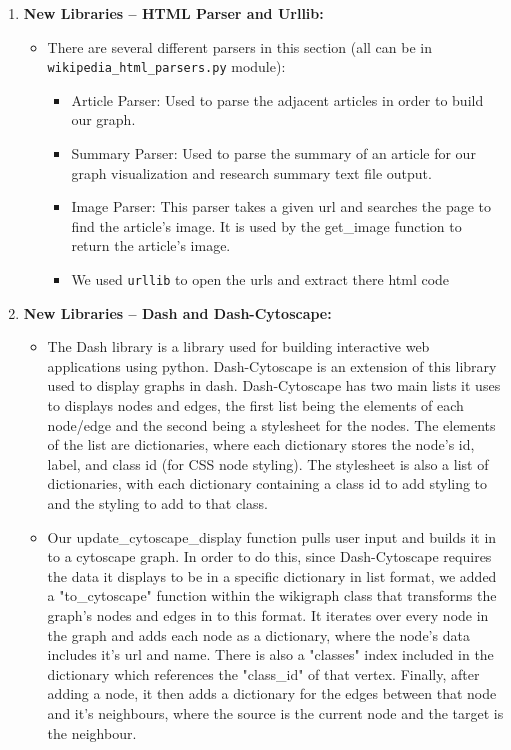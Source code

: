 \documentclass[fontsize=11pt]{article}
\begin{document}
\begin{enumerate}
\begin{itemize}
    \end{itemize}
    \item \textbf{New Libraries – HTML Parser and Urllib:}
    \begin{itemize}
        \item There are several different parsers in this section (all can be in \texttt{wikipedia\_html\_parsers.py} module):
        \begin{itemize}
        \item Article Parser: Used to parse the adjacent articles in order to build our graph.
        \item Summary Parser: Used to parse the summary of an article for our graph visualization and research summary text file output.
        \item Image Parser: This parser takes a given url and searches the page to find the article's image.  It is used by the get\_image function to return the article's image.
        \item We used \texttt{urllib} to open the urls and extract there html code
        \end{itemize}
    \end{itemize}
    \item \textbf{New Libraries – Dash and Dash-Cytoscape:}
    \begin{itemize}
        \item The Dash library is a library used for building interactive web applications using python. Dash-Cytoscape is an extension of this library used to display graphs in dash. Dash-Cytoscape has two main lists it uses to displays nodes and edges, the first list being the elements of each node/edge and the second being a stylesheet for the nodes. The elements of the list are dictionaries, where each dictionary stores the node's id, label, and class id (for CSS node styling). The stylesheet is also a list of dictionaries, with each dictionary containing a class id to add styling to and the styling to add to that class.
        \item Our update\_cytoscape\_display function pulls user input and builds it in to a cytoscape graph. In order to do this, since Dash-Cytoscape requires the data it displays to be in a specific dictionary in list format, we added a "to\_cytoscape" function within the wikigraph class that transforms the graph's nodes and edges in to this format. It iterates over every node in the graph and adds each node as a dictionary, where the node's data includes it's url and name. There is also a "classes" index included in the dictionary which references the "class\_id" of that vertex. Finally, after adding a node, it then adds a dictionary for the edges between that node and it's neighbours, where the source is the current node and the target is the neighbour. 

\end{itemize}
\end{enumerate}
\end{document}
